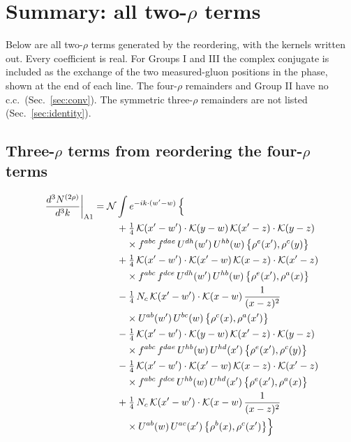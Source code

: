 \documentclass[10pt]{article}
\numberwithin{equation}{section}
\newcommand{\KK}{\mathcal K}
\newcommand{\NN}{\mathcal N}
\begin{document}
\section{Summary: all two-$\rho$ terms}\label{sec:summary}
Below are all two-$\rho$ terms generated by the reordering, with the kernels written out. Every coefficient is real. For Groups I and III the complex conjugate is included as the exchange of the two measured-gluon positions in the phase, shown at the end of each line. The four-$\rho$ remainders and Group II have no c.c.\ (Sec.~\ref{sec:conv}). The symmetric three-$\rho$ remainders are not listed (Sec.~\ref{sec:identity}).
\subsection*{Three-$\rho$ terms from reordering the four-$\rho$ terms}
\begin{align}
\frac{d^3N^{(2\rho)}}{d^3k}\bigg|_{\rm A1}={}&\NN\int e^{-ik\cdot(w'-w)}\,\Big\{\notag\\
&\quad +\tfrac14\,\KK(x'-w')\cdot\KK(y-w)\,\KK(x'-z)\cdot\KK(y-z)\notag\\
&\qquad\times f^{abc}\,f^{dae}\,U^{dh}(w')\,U^{hb}(w)\,\big\{\rho^{e}(x'),\rho^{c}(y)\big\}\notag\\
&\quad +\tfrac14\,\KK(x'-w')\cdot\KK(x'-w)\,\KK(x-z)\cdot\KK(x'-z)\notag\\
&\qquad\times f^{abc}\,f^{dce}\,U^{dh}(w')\,U^{hb}(w)\,\big\{\rho^{e}(x'),\rho^{a}(x)\big\}\notag\\
&\quad -\tfrac14\,N_{c}\,\KK(x'-w')\cdot\KK(x-w)\,\frac{1}{(x-z)^2}\notag\\
&\qquad\times U^{ab}(w')\,U^{bc}(w)\,\big\{\rho^{c}(x),\rho^{a}(x')\big\}\notag\\
&\quad -\tfrac14\,\KK(x'-w')\cdot\KK(y-w)\,\KK(x'-z)\cdot\KK(y-z)\notag\\
&\qquad\times f^{abc}\,f^{dae}\,U^{hb}(w)\,U^{hd}(x')\,\big\{\rho^{e}(x'),\rho^{c}(y)\big\}\notag\\
&\quad -\tfrac14\,\KK(x'-w')\cdot\KK(x'-w)\,\KK(x-z)\cdot\KK(x'-z)\notag\\
&\qquad\times f^{abc}\,f^{dce}\,U^{hb}(w)\,U^{hd}(x')\,\big\{\rho^{e}(x'),\rho^{a}(x)\big\}\notag\\
&\quad +\tfrac14\,N_{c}\,\KK(x'-w')\cdot\KK(x-w)\,\frac{1}{(x-z)^2}\notag\\
&\qquad\times U^{ab}(w)\,U^{ac}(x')\,\big\{\rho^{b}(x),\rho^{c}(x')\big\}\Big\}\label{eq:sum-A1}
\end{align}
\end{document}
